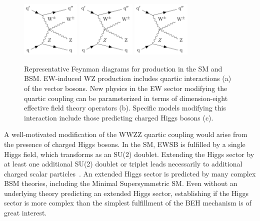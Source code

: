 \begin{figure}[htbp]
  \centering
   \includegraphics[page=1,width=0.25\textwidth]{figures/FeynmanDiagrams/feynmanVBS.pdf}
   \includegraphics[page=2,width=0.25\textwidth]{figures/FeynmanDiagrams/feynmanVBS.pdf}
   \includegraphics[page=3,width=0.25\textwidth]{figures/FeynmanDiagrams/feynmanVBS.pdf}
  \caption{Representative Feynman diagrams for \WZjj production in the SM and BSM. 
  EW-induced WZ production includes quartic interactions (a) of the vector bosons.
  New physics in the EW sector modifying the quartic coupling 
  can be parameterized in terms of dimension-eight effective field theory operators (b).
  Specific models modifying this interaction include those predicting charged Higgs bosons (c).
  }
 \label{fig:feynmanDiagrams}
\end{figure}

A well-motivated modification of the WWZZ quartic coupling would arise from
the presence of charged Higgs bosons.
In the SM, EWSB is fulfilled by a single Higgs field, which transforms as an SU(2) doublet.
Extending the Higgs sector by at least one additional SU(2) doublet or triplet leads necessarily
to additional charged scalar particles~\cite{Arbey:2017gmh}. An extended Higgs sector is predicted by many
complex BSM theories, including the Minimal Supersymmetric SM. 
Even without an 
underlying theory predicting an extended Higgs sector, establishing if the Higgs 
sector is more complex than the simplest fulfillment of the BEH mechanism is of 
great interest.

